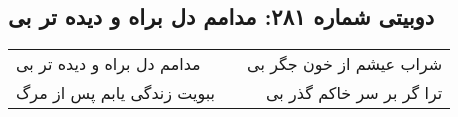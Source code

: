 \begin{center}
\section*{دوبیتی شماره ۲۸۱: مدامم دل براه و دیده تر بی}
\label{sec:281}
\begin{longtable}{l p{0.5cm} r}
مدامم دل براه و دیده تر بی
&&
شراب عیشم از خون جگر بی
\\
ببویت زندگی یابم پس از مرگ
&&
ترا گر بر سر خاکم گذر بی
\\
\end{longtable}
\end{center}

